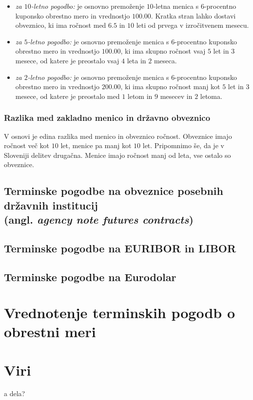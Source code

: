 \documentclass[a4paper]{article}
\begin{document}
\begin{itemize}
    \item \textit{za $10$-letno pogodbo:} je osnovno premoženje $10$-letna menica s $6$-procentno
            kuponsko obrestno mero in vrednostjo \textdollar$100.00$. Kratka stran lahko dostavi 
            obveznico, ki ima ročnost med $6.5$ in $10$ leti od prvega v izročitvenem mesecu.
    \item \textit{za $5$-letno pogodbo:} je osnovno premoženje menica s $6$-procentno kuponsko 
            obrestno mero in vrednostjo \textdollar$100.00$, ki ima skupno ročnost vsaj $5$ let
            in $3$ mesece, od katere je preostalo vsaj $4$ leta in $2$ meseca.
    \item \textit{za $2$-letno pogodbo:} je osnovno premoženje menica s $6$-procentno kuponsko 
    obrestno mero in vrednostjo \textdollar$200.00$, ki ima skupno ročnost manj kot $5$ let
    in $3$ mesece, od katere je preostalo med $1$ letom in $9$ mesecev in $2$ letoma.
\end{itemize} 

\subsubsection{Razlika med zakladno menico in državno obveznico}
V osnovi je edina razlika med menico in obveznico ročnost. Obveznice imajo ročnost več kot $10$
let, menice pa manj kot $10$ let. Pripomnimo še, da je v Sloveniji delitev drugačna. Menice imajo
ročnost manj od leta, vse ostalo so obveznice.

\subsection{Terminske pogodbe na obveznice posebnih državnih institucij \\
            (angl. \textit{agency note futures contracts})}

            
\subsection{Terminske pogodbe na EURIBOR in LIBOR}
\subsection{Terminske pogodbe na Eurodolar}

\section{Vrednotenje terminskih pogodb o obrestni meri}


\section{Viri}
\begin{description}
    \item a dela?
\end{description}
\end{document}
